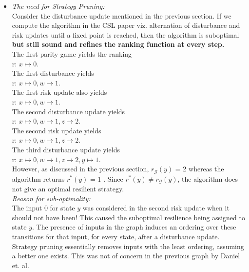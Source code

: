 \begin{itemize}
\item \emph{The need for Strategy Pruning: } \\
Consider the disturbance update mentioned in the previous section. If we compute the algorithm in the CSL paper viz. alternation of disturbance and risk updates until a fixed point is reached, then the algorithm is suboptimal \textbf{but still sound and refines the ranking function at every step.} \\
The first parity game yields the ranking \\r: $ x\mapsto 0$. \\
The first disturbance yields \\r: $ x\mapsto 0, w \mapsto 1 $.\\
The first risk update also yields \\r: $ x\mapsto 0 , w \mapsto 1 $. \\
The second disturbance update yields \\r: $ x\mapsto 0 , w \mapsto 1 , z \mapsto 2$.\\
The second risk update yields \\r: $ x\mapsto 0 , w \mapsto 1 , z \mapsto 2$.\\
The third disturbance update yields \\r: $ x\mapsto 0 , w \mapsto 1 , z \mapsto 2, y \mapsto 1$.\\
However, as discussed in the previous section, $r_\mathcal G(y)$ = 2 whereas the algorithm returns $r^\ast(y)$ = 1 . Since $r^\ast(y) \neq r_\mathcal G(y)$, the algorithm does not give an optimal resilient strategy.\\

\emph{Reason for sub-optimality:} \\
The input $0$ for state $y$  was considered in the second risk update when it should not have been! This caused the suboptimal resilience being assigned to state $y$.
The presence of inputs in the graph induces an ordering over these transitions for that input, for every state, after a disturbance update. Strategy pruning essentially removes inputs with the least ordering, assuming a better one exists. This was not of concern in the previous graph by Daniel et. al. \\


\end{itemize}
